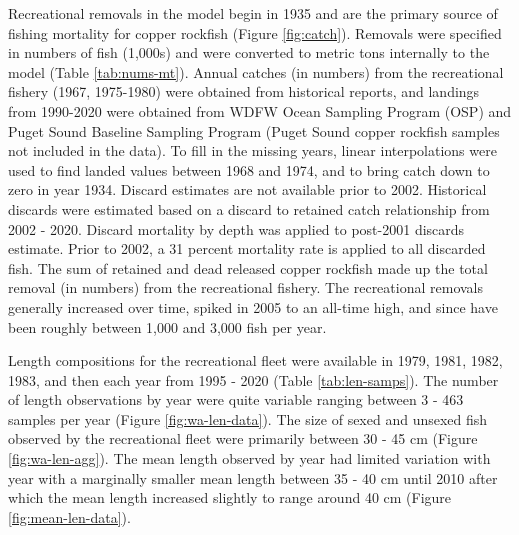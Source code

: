 \documentclass[11pt,
  english,
  a4paper,
]{article}
\begin{document}
\leavevmode\tagmcend\tagstructend


Recreational removals in the model begin in 1935 and are the primary source of fishing mortality for copper rockfish (Figure \ref{fig:catch}). Removals were specified in numbers of fish (1,000s) and were converted to metric tons internally to the model (Table \ref{tab:nums-mt}). Annual catches (in numbers) from the recreational fishery (1967, 1975-1980) were obtained from historical reports, and landings from 1990-2020 were obtained from WDFW Ocean Sampling Program (OSP) and Puget Sound Baseline Sampling Program (Puget Sound copper rockfish samples not included in the data). To fill in the missing years, linear interpolations were used to find landed values between 1968 and 1974, and to bring catch down to zero in year 1934. Discard estimates are not available prior to 2002. Historical discards were estimated based on a discard to retained catch relationship from 2002 - 2020. Discard mortality by depth was applied to post-2001 discards estimate. Prior to 2002, a 31 percent mortality rate is applied to all discarded fish. The sum of retained and dead released copper rockfish made up the total removal (in numbers) from the recreational fishery. The recreational removals generally increased over time, spiked in 2005 to an all-time high, and since have been roughly between 1,000 and 3,000 fish per year.

\leavevmode\tagmcend\tagstructend\par


Length compositions for the recreational fleet were available in 1979, 1981, 1982, 1983, and then each year from 1995 - 2020 (Table \ref{tab:len-samps}). The number of length observations by year were quite variable ranging between 3 - 463 samples per year (Figure \ref{fig:wa-len-data}). The size of sexed and unsexed fish observed by the recreational fleet were primarily between 30 - 45 cm (Figure \ref{fig:wa-len-agg}). The mean length observed by year had limited variation with year with a marginally smaller mean length between 35 - 40 cm until 2010 after which the mean length increased slightly to range around 40 cm (Figure \ref{fig:mean-len-data}).

\leavevmode\tagmcend\tagstructend\par

\end{document}
